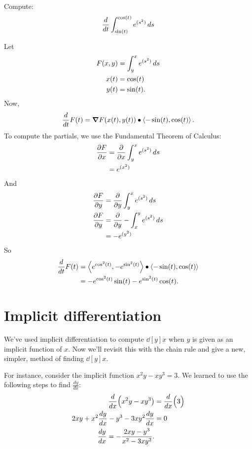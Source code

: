 \documentclass{ximera}
\begin{document}
\begin{example}
  Compute:
  \[
  \dd{t} \int_{\sin(t)}^{\cos(t)} e^{(s^2)} \d s
  \]
  \begin{explanation}
    Let
    \begin{align*}
      F(x,y) &= \int_y^x e^{(s^2)} \d s\\
      x(t) &= \cos(t)\\
      y(t) &= \sin(t).
    \end{align*}
    Now,
    \[
    \dd{t} F(t) = \grad F(x(t),y(t)) \dotp \vector{-\sin(t),\cos(t)}.
    \]
    To compute the partials, we use the Fundamental Theorem of Calculus:
    \begin{align*}
    \pp[F]{x} &= \pp{x} \int_y^x e^{(s^2)} \d s\\
    &= e^{(x^2)}
    \end{align*}
    And
    \begin{align*}
      \pp[F]{y} &= \pp{y} \int_y^x e^{(s^2)} \d s\\
      \pp[F]{y} &= \pp{y} -\int_x^y e^{(s^2)} \d s\\
      &= -e^{(y^2)}
    \end{align*}
    So
    \begin{align*}
      \dd{t} F(t) &= \vector{e^{\cos^2(t)},-e^{\sin^2(t)}}\dotp \vector{-\sin(t),\cos(t)}\\
      &= -e^{\cos^2(t)}\sin(t)-e^{\sin^2(t)}\cos(t).
    \end{align*}
  \end{explanation}
\end{example}

\section{Implicit differentiation}

We've used implicit differentiation to compute $\dd[y]{x}$ when $y$ is
given as an implicit function of $x$. Now we'll revisit this with the
chain rule and give a new, simpler, method of finding $\dd[y]{x}$.

For instance, consider the implicit function $x^2y-xy^3=3$. We learned
to use the following steps to find $\frac{dy}{dx}$:
\begin{align}
\frac{d}{dx}\Big(x^2y-xy^3\big) &= \frac{d}{dx}\Big(3\Big) \notag\\
2xy + x^2\frac{dy}{dx}-y^3-3xy^2\frac{dy}{dx} &= 0\notag \\
\frac{dy}{dx} = -\frac{2xy-y^3}{x^2-3xy^2}.\label{eq:mchain2}
\end{align}
\end{document}
